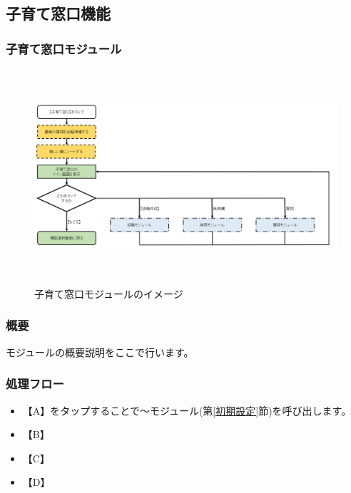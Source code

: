 \documentclass[a4j]{jarticle}
\begin{document}
\subsection{子育て窓口機能}
\subsubsection{子育て窓口モジュール\label{子育て窓口}} %
\begin{figure}[H]
    \begin{center}
      \includegraphics[height=8.0cm] {子育て窓口_全体.PNG} %
    \caption {子育て窓口モジュールのイメージ}
    \label{functionselection}
    \end{center}
\end{figure}
\subsubsection*{概要}
モジュールの概要説明をここで行います。
\subsubsection*{処理フロー}
\begin{itemize}
\item 【A】をタップすることで～モジュール(第\ref{初期設定}節)を呼び出します。%
\item 【B】
\item 【C】
\item 【D】
\end{itemize}
\end{document}
